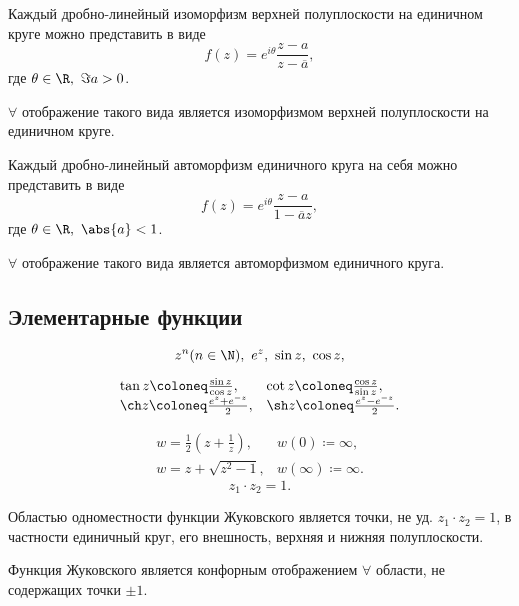 \begin{theorem}
	Каждый дробно-линейный изоморфизм верхней полуплоскости на единичном круге можно представить в виде
	\[
		f(z) = e^{i \theta } \frac{z - a}{z - \overline{a} } ,
	\]
	где $\theta \in \R, \ \Im a > 0$.

	$\forall $ отображение такого вида является изоморфизмом верхней полуплоскости на единичном круге.
\end{theorem}

\begin{theorem}
	Каждый дробно-линейный автоморфизм единичного круга на себя можно представить в виде
	\[
		f(z) = e^{i \theta } \frac{z - a}{1 - \overline{a} z} ,
	\]
	где $\theta \in \R, \ \abs{a} < 1$.

	$\forall $ отображение такого вида является автоморфизмом единичного круга.
\end{theorem}

\subsection{Элементарные функции}

\[
	z^n(n \in \N), \ e^z, \ \sin z, \ \cos z,
\]

\[
	\begin{array}{ll}
		\tan z \coloneq \frac{\sin z}{\cos z} ,   & \cot z \coloneq \frac{\cos z}{\sin z} ,  \\
		\ch z \coloneq \frac{e^z + e^{-z}  }{2} , & \sh z \coloneq \frac{e^z - e^{-z} }{2} .
	\end{array}
\]

\begin{note}
	\[
		\begin{array}{ll}
			w = \frac{1}{2} (z+\frac{1}{z} ), & w(0) \coloneq \infty,       \\
			w = z + \sqrt{z^2 - 1},           & w(\infty )\coloneq \infty .
		\end{array}
	\]
	\[
		z_1 \cdot z_2 = 1.
	\]

	Областью одноместности функции Жуковского является точки, не уд. $z_1 \cdot z_2 = 1$, в частности единичный круг, его внешность, верхняя и нижняя полуплоскости.

	Функция Жуковского является конфорным отображением $\forall $ области, не содержащих точки $\pm 1$.
\end{note}
